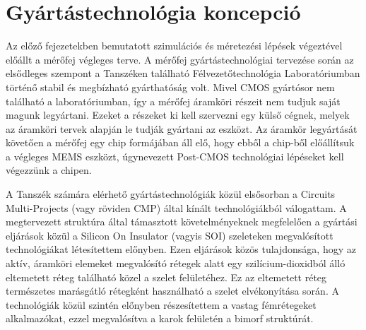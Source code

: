 \chapter{Gyártástechnológia koncepció}
\label{chap:manufacturing}

Az előző fejezetekben bemutatott szimulációs és méretezési lépések végeztével előállt a mérőfej végleges terve. A mérőfej gyártástechnológiai tervezése során az elsődleges szempont a Tanszéken található Félvezetőtechnológia Laboratóriumban történő stabil és megbízható gyárthatóság volt. Mivel CMOS gyártósor nem található a laboratóriumban, így a mérőfej áramköri részeit nem tudjuk saját magunk legyártani. Ezeket a részeket ki kell szervezni egy külső cégnek, melyek az áramköri tervek alapján le tudják gyártani az eszközt. Az áramkör legyártását követően a mérőfej egy chip formájában áll elő, hogy ebből a chip-ből előállítsuk a végleges MEMS eszközt, úgynevezett Post-CMOS technológiai lépéseket kell végezzünk a chipen.

A Tanszék számára elérhető gyártástechnológiák közül elsősorban a Circuits Multi-Projects\cite{CMP} (vagy röviden CMP) által kínált technológiákból válogattam. A megtervezett struktúra által támasztott követelményeknek megfelelően a gyártási eljárások közül a Silicon On Insulator (vagyis SOI) szeleteken megvalósított technológiákat létesítettem előnyben. Ezen eljárások közös tulajdonsága, hogy az aktív, áramköri elemeket megvalósító rétegek alatt egy szilícium-dioxidból álló eltemetett réteg található közel a szelet felületéhez. Ez az eltemetett réteg természetes marásgátló rétegként használható a szelet elvékonyítása során. A technológiák közül szintén előnyben részesítettem a vastag fémrétegeket alkalmazókat, ezzel megvalósítva a karok felületén a bimorf struktúrát.

